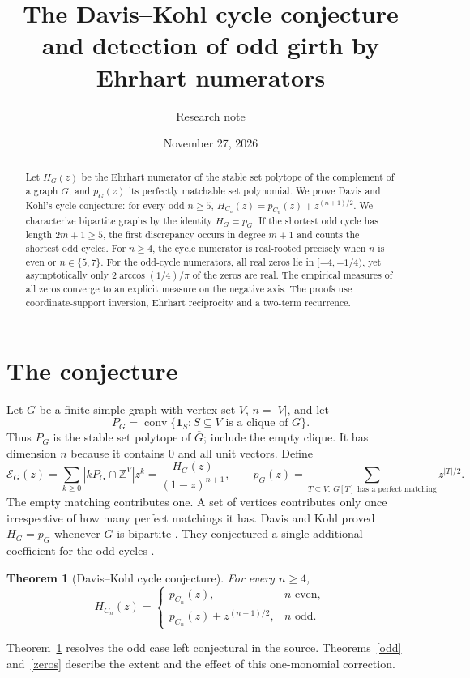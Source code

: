 \documentclass[11pt]{article}
\title{The Davis--Kohl cycle conjecture\\and detection of odd girth by Ehrhart numerators}
\author{Research note}
\date{November 27, 2026}
\newtheorem{theorem}{Theorem}[section]
\DeclareMathOperator{\conv}{conv}
\newcommand{\one}{\mathbf1}
\newcommand{\ZZ}{\mathbb Z}
\newcommand{\EE}{\mathcal E}
\begin{document}
\maketitle
\begin{abstract}
Let $H_G(z)$ be the Ehrhart numerator of the stable set polytope of the complement of a graph $G$, and $p_G(z)$ its perfectly matchable set polynomial. We prove Davis and Kohl's cycle conjecture: for every odd $n\ge5$, $H_{C_n}(z)=p_{C_n}(z)+z^{(n+1)/2}$. We characterize bipartite graphs by the identity $H_G=p_G$. If the shortest odd cycle has length $2m+1\ge5$, the first discrepancy occurs in degree $m+1$ and counts the shortest odd cycles. For $n\ge4$, the cycle numerator is real-rooted precisely when $n$ is even or $n\in\{5,7\}$. For the odd-cycle numerators, all real zeros lie in $[-4,-1/4)$, yet asymptotically only $2\arccos(1/4)/\pi$ of the zeros are real. The empirical measures of all zeros converge to an explicit measure on the negative axis. The proofs use coordinate-support inversion, Ehrhart reciprocity and a two-term recurrence.
\end{abstract}

\section{The conjecture}
Let $G$ be a finite simple graph with vertex set $V$, $n=|V|$, and let
\[
 P_G=\conv\{\one_S:S\subseteq V\text{ is a clique of }G\}.
\]
Thus $P_G$ is the stable set polytope of $\overline{G}$; include the empty clique. It has dimension $n$ because it contains $0$ and all unit vectors. Define
\[
 \EE_G(z)=\sum_{k\ge0}|kP_G\cap\ZZ^V|z^k=\frac{H_G(z)}{(1-z)^{n+1}},
 \qquad
 p_G(z)=\sum_{T\subseteq V:\ G[T]\text{ has a perfect matching}}z^{|T|/2}.
\]
The empty matching contributes one. A set of vertices contributes only once irrespective of how many perfect matchings it has. Davis and Kohl proved $H_G=p_G$ whenever $G$ is bipartite \cite[Lemma~3.11]{DK}. They conjectured a single additional coefficient for the odd cycles \cite[Conj.~3.15, preprint numbering]{DK}.

\begin{theorem}[Davis--Kohl cycle conjecture]\label{cycle}
For every $n\ge4$,
\[
 H_{C_n}(z)=
 \begin{cases}
 p_{C_n}(z),& n\text{ even},\\
 p_{C_n}(z)+z^{(n+1)/2},& n\text{ odd}.
 \end{cases}
\]
\end{theorem}
Theorem~\ref{cycle} resolves the odd case left conjectural in the source. Theorems~\ref{odd} and~\ref{zeros} describe the extent and the effect of this one-monomial correction.
\end{document}
